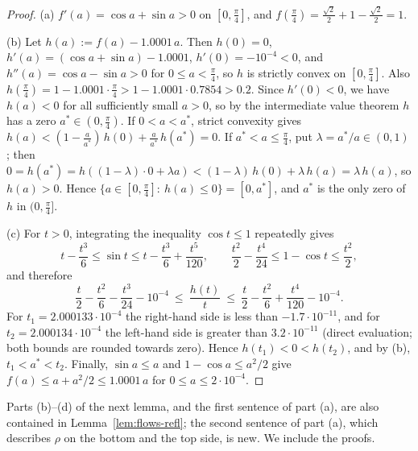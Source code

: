 \documentclass[11pt]{amsart}
\theoremstyle{definition}
\theoremstyle{remark}
\numberwithin{equation}{section}
\begin{document}
\begin{proof}
(a) $f'(a)=\cos a+\sin a>0$ on $[0,\frac\pi4]$, and $f(\frac\pi4)=\frac{\sqrt2}2+1-\frac{\sqrt2}2=1$.

(b) Let $h(a):=f(a)-1.0001\,a$. Then $h(0)=0$, $h'(a)=(\cos a+\sin a)-1.0001$, $h'(0)=-10^{-4}<0$, and $h''(a)=\cos a-\sin a>0$ for $0\le a<\frac\pi4$, so $h$ is strictly convex on $[0,\frac\pi4]$. Also $h(\frac\pi4)=1-1.0001\cdot\frac\pi4>1-1.0001\cdot0.7854>0.2$. Since $h'(0)<0$, we have $h(a)<0$ for all sufficiently small $a>0$, so by the intermediate value theorem $h$ has a zero $a^*\in(0,\frac\pi4)$. If $0<a<a^*$, strict convexity gives $h(a)<(1-\frac a{a^*})\,h(0)+\frac a{a^*}\,h(a^*)=0$. If $a^*<a\le\frac\pi4$, put $\lambda=a^*/a\in(0,1)$; then $0=h(a^*)=h((1-\lambda)\cdot0+\lambda a)<(1-\lambda)\,h(0)+\lambda\,h(a)=\lambda\,h(a)$, so $h(a)>0$. Hence $\{a\in[0,\frac\pi4]:\ h(a)\le0\}=[0,a^*]$, and $a^*$ is the only zero of $h$ in $(0,\frac\pi4]$.

(c) For $t>0$, integrating the inequality $\cos t\le1$ repeatedly gives
\[
t-\frac{t^3}6\le\sin t\le t-\frac{t^3}6+\frac{t^5}{120},\qquad \frac{t^2}2-\frac{t^4}{24}\le1-\cos t\le\frac{t^2}2,
\]
and therefore
\[
\frac t2-\frac{t^2}6-\frac{t^3}{24}-10^{-4}\ \le\ \frac{h(t)}t\ \le\ \frac t2-\frac{t^2}6+\frac{t^4}{120}-10^{-4}.
\]
For $t_1=2.000133\cdot10^{-4}$ the right-hand side is less than $-1.7\cdot10^{-11}$, and for $t_2=2.000134\cdot10^{-4}$ the left-hand side is greater than $3.2\cdot10^{-11}$ (direct evaluation; both bounds are rounded towards zero). Hence $h(t_1)<0<h(t_2)$, and by (b), $t_1<a^*<t_2$. Finally, $\sin a\le a$ and $1-\cos a\le a^2/2$ give $f(a)\le a+a^2/2\le1.0001\,a$ for $0\le a\le2\cdot10^{-4}$.
\end{proof}

Parts (b)--(d) of the next lemma, and the first sentence of part (a), are also contained in Lemma~\ref{lem:flows-refl};
the second sentence of part (a), which describes $\rho$ on the bottom and the top side, is new. We include the proofs.
\end{document}
